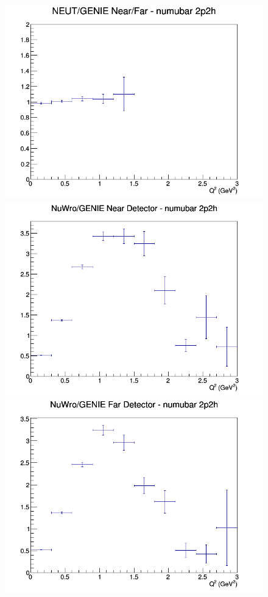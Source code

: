 \documentclass[12pt]{article}
\begin{document}
\begin{figure}[h]
\endminipage
{}
\includegraphics[width=\linewidth]{Q2/nominal/ratios/2p2h_NEUT_GENIE_numubar_NF_Q2.png}
\endminipage
\newline
{}
\includegraphics[width=\linewidth]{Q2/nominal/ratios/2p2h_NuWro_GENIE_numubar_near_Q2.png}
\endminipage
{}
\includegraphics[width=\linewidth]{Q2/nominal/ratios/2p2h_NuWro_GENIE_numubar_far_Q2.png}

\end{figure}
\end{document}
